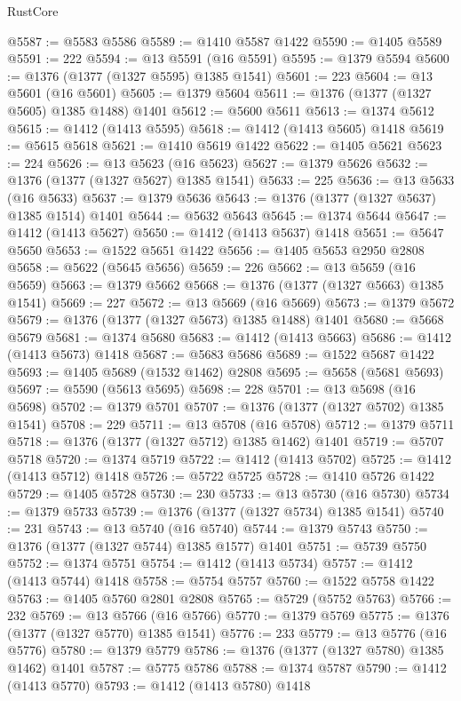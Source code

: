 \begin{lexlean}{RustCore}
\begin{coremodule}
@5587 := @5583 @5586
@5589 := @1410 @5587 @1422
@5590 := @1405 @5589
@5591 := 222
@5594 := @13 @5591 (@16 @5591)
@5595 := @1379 @5594
@5600 := @1376 (@1377 (@1327 @5595) @1385 @1541)
@5601 := 223
@5604 := @13 @5601 (@16 @5601)
@5605 := @1379 @5604
@5611 := @1376 (@1377 (@1327 @5605) @1385 @1488) @1401
@5612 := @5600 @5611
@5613 := @1374 @5612
@5615 := @1412 (@1413 @5595)
@5618 := @1412 (@1413 @5605) @1418
@5619 := @5615 @5618
@5621 := @1410 @5619 @1422
@5622 := @1405 @5621
@5623 := 224
@5626 := @13 @5623 (@16 @5623)
@5627 := @1379 @5626
@5632 := @1376 (@1377 (@1327 @5627) @1385 @1541)
@5633 := 225
@5636 := @13 @5633 (@16 @5633)
@5637 := @1379 @5636
@5643 := @1376 (@1377 (@1327 @5637) @1385 @1514) @1401
@5644 := @5632 @5643
@5645 := @1374 @5644
@5647 := @1412 (@1413 @5627)
@5650 := @1412 (@1413 @5637) @1418
@5651 := @5647 @5650
@5653 := @1522 @5651 @1422
@5656 := @1405 @5653 @2950 @2808
@5658 := @5622 (@5645 @5656)
@5659 := 226
@5662 := @13 @5659 (@16 @5659)
@5663 := @1379 @5662
@5668 := @1376 (@1377 (@1327 @5663) @1385 @1541)
@5669 := 227
@5672 := @13 @5669 (@16 @5669)
@5673 := @1379 @5672
@5679 := @1376 (@1377 (@1327 @5673) @1385 @1488) @1401
@5680 := @5668 @5679
@5681 := @1374 @5680
@5683 := @1412 (@1413 @5663)
@5686 := @1412 (@1413 @5673) @1418
@5687 := @5683 @5686
@5689 := @1522 @5687 @1422
@5693 := @1405 @5689 (@1532 @1462) @2808
@5695 := @5658 (@5681 @5693)
@5697 := @5590 (@5613 @5695)
@5698 := 228
@5701 := @13 @5698 (@16 @5698)
@5702 := @1379 @5701
@5707 := @1376 (@1377 (@1327 @5702) @1385 @1541)
@5708 := 229
@5711 := @13 @5708 (@16 @5708)
@5712 := @1379 @5711
@5718 := @1376 (@1377 (@1327 @5712) @1385 @1462) @1401
@5719 := @5707 @5718
@5720 := @1374 @5719
@5722 := @1412 (@1413 @5702)
@5725 := @1412 (@1413 @5712) @1418
@5726 := @5722 @5725
@5728 := @1410 @5726 @1422
@5729 := @1405 @5728
@5730 := 230
@5733 := @13 @5730 (@16 @5730)
@5734 := @1379 @5733
@5739 := @1376 (@1377 (@1327 @5734) @1385 @1541)
@5740 := 231
@5743 := @13 @5740 (@16 @5740)
@5744 := @1379 @5743
@5750 := @1376 (@1377 (@1327 @5744) @1385 @1577) @1401
@5751 := @5739 @5750
@5752 := @1374 @5751
@5754 := @1412 (@1413 @5734)
@5757 := @1412 (@1413 @5744) @1418
@5758 := @5754 @5757
@5760 := @1522 @5758 @1422
@5763 := @1405 @5760 @2801 @2808
@5765 := @5729 (@5752 @5763)
@5766 := 232
@5769 := @13 @5766 (@16 @5766)
@5770 := @1379 @5769
@5775 := @1376 (@1377 (@1327 @5770) @1385 @1541)
@5776 := 233
@5779 := @13 @5776 (@16 @5776)
@5780 := @1379 @5779
@5786 := @1376 (@1377 (@1327 @5780) @1385 @1462) @1401
@5787 := @5775 @5786
@5788 := @1374 @5787
@5790 := @1412 (@1413 @5770)
@5793 := @1412 (@1413 @5780) @1418

\end{coremodule}
\end{lexlean}
